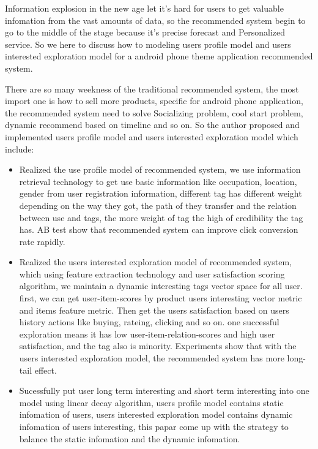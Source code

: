 \begin{enabstract}
Information explosion in the new age let it's hard for users to get valuable infomation from the vast amounts of data, so the recommended system begin to go to the middle of the stage because it's precise forecast and Personalized service. So we here to discuss how to modeling users profile model and users interested exploration model for a android phone theme application recommended system.

There are so many weekness of the traditional recommended system, the most import one is how to sell more products, specific for android phone application, the recommended system need to solve Socializing problem, cool start problem, dynamic recommend based on timeline and so on. So the author proposed and implemented users profile model and users interested exploration model which include: 
\begin{itemize}
	\item Realized the use profile model of recommended system, we use information retrieval technology to get use basic information like occupation, location, gender from user registration information, different tag has different weight depending on the way they got, the path of they transfer and the relation between use and tags, the more weight of tag the high of credibility the tag has. AB test show that recommended system can improve click conversion rate rapidly.
	\item Realized the users interested exploration model of recommended system, which using feature extraction technology and user satisfaction scoring algorithm, we maintain a dynamic interesting tags vector space for all user. first, we can get user-item-scores by product users interesting vector metric and items feature metric. Then get the users satisfaction based on users history actions like buying, rateing, clicking and so on. one successful exploration means it has low user-item-relation-scores and high user satisfaction, and the tag also is minority. Experiments show that with the users interested exploration model, the recommended system has more long-tail effect.
	\item Sucessfully put user long term interesting and short term interesting into one model using linear decay algorithm, users profile model contains static infomation of users, users interested exploration model contains dynamic infomation of users interesting, this papar come up with the strategy to balance the static infomation and the dynamic infomation.
\end{itemize}
\end{enabstract}
